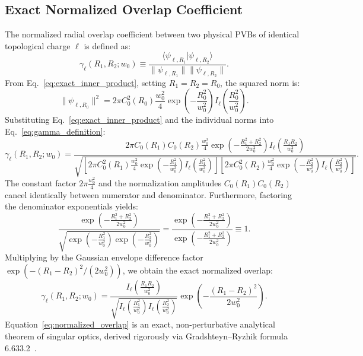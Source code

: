 \documentclass[11pt,a4paper]{article}
\begin{document}
\subsection{Exact Normalized Overlap Coefficient}

The normalized radial overlap coefficient between two physical PVBs of identical topological charge $\ell$ is defined as:
\begin{equation}
\gamma_\ell(R_1, R_2; w_0) \equiv \frac{\langle \psi_{\ell, R_1} | \psi_{\ell, R_2} \rangle}{\|\psi_{\ell, R_1}\| \|\psi_{\ell, R_2}\|}.
\label{eq:gamma_definition}
\end{equation}
From Eq.~\eqref{eq:exact_inner_product}, setting $R_1 = R_2 = R_0$, the squared norm is:
\begin{equation}
\|\psi_{\ell, R_0}\|^2 = 2\pi C_0^2(R_0) \frac{w_0^2}{4} \exp\left( - \frac{R_0^2}{w_0^2} \right) I_\ell\left( \frac{R_0^2}{w_0^2} \right).
\label{eq:squared_norm_recap}
\end{equation}
Substituting Eq.~\eqref{eq:exact_inner_product} and the individual norms into Eq.~\eqref{eq:gamma_definition}:
\begin{equation}
\gamma_\ell(R_1, R_2; w_0) = \frac{2\pi C_0(R_1) C_0(R_2) \frac{w_0^2}{4} \exp\left( - \frac{R_1^2 + R_2^2}{2 w_0^2} \right) I_\ell\left( \frac{R_1 R_2}{w_0^2} \right)}{\sqrt{\left[ 2\pi C_0^2(R_1) \frac{w_0^2}{4} \exp\left( - \frac{R_1^2}{w_0^2} \right) I_\ell\left( \frac{R_1^2}{w_0^2} \right) \right] \left[ 2\pi C_0^2(R_2) \frac{w_0^2}{4} \exp\left( - \frac{R_2^2}{w_0^2} \right) I_\ell\left( \frac{R_2^2}{w_0^2} \right) \right]}}.
\label{eq:gamma_substitution}
\end{equation}
The constant factor $2\pi \frac{w_0^2}{4}$ and the normalization amplitudes $C_0(R_1) C_0(R_2)$ cancel identically between numerator and denominator. Furthermore, factoring the denominator exponentials yields:
\begin{equation}
\frac{\exp\left( - \frac{R_1^2 + R_2^2}{2 w_0^2} \right)}{\sqrt{\exp\left( - \frac{R_1^2}{w_0^2} \right) \exp\left( - \frac{R_2^2}{w_0^2} \right)}} = \frac{\exp\left( - \frac{R_1^2 + R_2^2}{2 w_0^2} \right)}{\exp\left( - \frac{R_1^2 + R_2^2}{2 w_0^2} \right)} \equiv 1.
\label{eq:exponential_cancellation}
\end{equation}
Multiplying by the Gaussian envelope difference factor $\exp(-(R_1-R_2)^2 / (2w_0^2))$, we obtain the exact normalized overlap:
\begin{equation}
\boxed{\gamma_\ell(R_1, R_2; w_0) = \frac{I_\ell\left( \frac{R_1 R_2}{w_0^2} \right)}{\sqrt{I_\ell\left( \frac{R_1^2}{w_0^2} \right) I_\ell\left( \frac{R_2^2}{w_0^2} \right)}} \exp\left( - \frac{(R_1 - R_2)^2}{2 w_0^2} \right).}
\label{eq:normalized_overlap}
\end{equation}
Equation~\eqref{eq:normalized_overlap} is an exact, non-perturbative analytical theorem of singular optics, derived rigorously via Gradshteyn--Ryzhik formula 6.633.2~\cite{Gradshteyn2014}.
\end{document}
